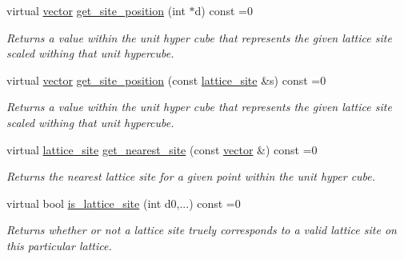 \begin{DoxyCompactItemize}
\mbox{\label{classsisl_1_1base__lattice_a25f87033a3974fff880f124c49c3dbe3}} 
virtual \hyperlink{namespacesisl_a2069bd5374a9be042ff3ce3306d41e1a}{vector} \hyperlink{classsisl_1_1base__lattice_a25f87033a3974fff880f124c49c3dbe3}{get\+\_\+site\+\_\+position} (int $\ast$d) const =0
\begin{DoxyCompactList}\small\item\em Returns a value within the unit hyper cube that represents the given lattice site scaled withing that unit hypercube. \end{DoxyCompactList}\item 
\mbox{\label{classsisl_1_1base__lattice_a030d1230d44e9c88e8f79ef87920b4ed}} 
virtual \hyperlink{namespacesisl_a2069bd5374a9be042ff3ce3306d41e1a}{vector} \hyperlink{classsisl_1_1base__lattice_a030d1230d44e9c88e8f79ef87920b4ed}{get\+\_\+site\+\_\+position} (const \hyperlink{namespacesisl_acd18feee4026583db6185df2b25434aa}{lattice\+\_\+site} \&s) const =0
\begin{DoxyCompactList}\small\item\em Returns a value within the unit hyper cube that represents the given lattice site scaled withing that unit hypercube. \end{DoxyCompactList}\item 
\mbox{\label{classsisl_1_1base__lattice_a0b789f66f4b822a62b2d5b22fa2804b5}} 
virtual \hyperlink{namespacesisl_acd18feee4026583db6185df2b25434aa}{lattice\+\_\+site} \hyperlink{classsisl_1_1base__lattice_a0b789f66f4b822a62b2d5b22fa2804b5}{get\+\_\+nearest\+\_\+site} (const \hyperlink{namespacesisl_a2069bd5374a9be042ff3ce3306d41e1a}{vector} \&) const =0
\begin{DoxyCompactList}\small\item\em Returns the nearest lattice site for a given point within the unit hyper cube. \end{DoxyCompactList}\item 
\mbox{\label{classsisl_1_1base__lattice_a4db34d7dc53ec4358433218a7daf33f9}} 
virtual bool \hyperlink{classsisl_1_1base__lattice_a4db34d7dc53ec4358433218a7daf33f9}{is\+\_\+lattice\+\_\+site} (int d0,...) const =0
\begin{DoxyCompactList}\small\item\em Returns whether or not a lattice site truely corresponds to a valid lattice site on this particular lattice. \end{DoxyCompactList}\item 

\end{DoxyCompactItemize}
